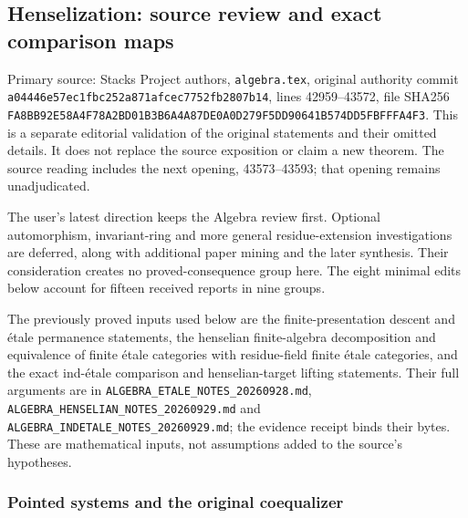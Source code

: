 \subsection{Henselization: source review and exact comparison maps}\label{algebra-proof-060-henselization-source-review-and-exact-comparison-maps}

Primary source: Stacks Project authors, \texttt{algebra.tex}, original authority commit \texttt{a044\allowbreak{}46e5\allowbreak{}7ec1\allowbreak{}fbc2\allowbreak{}52a8\allowbreak{}71af\allowbreak{}cec7\allowbreak{}752f\allowbreak{}b280\allowbreak{}7b14}, lines 42959--43572, file SHA256 \texttt{FA8B\allowbreak{}B92E\allowbreak{}58A4\allowbreak{}F78A\allowbreak{}2BD0\allowbreak{}1B3B\allowbreak{}6A4A\allowbreak{}87DE\allowbreak{}0A0D\allowbreak{}279F\allowbreak{}5DD9\allowbreak{}0641\allowbreak{}B574\allowbreak{}DD5F\allowbreak{}BFFF\allowbreak{}A4F3}. This is a separate editorial validation of the original statements and their omitted details. It does not replace the source exposition or claim a new theorem. The source reading includes the next opening, 43573--43593; that opening remains unadjudicated.

The user's latest direction keeps the Algebra review first. Optional automorphism, invariant-ring and more general residue-extension investigations are deferred, along with additional paper mining and the later synthesis. Their consideration creates no proved-consequence group here. The eight minimal edits below account for fifteen received reports in nine groups.

The previously proved inputs used below are the finite-presentation descent and étale permanence statements, the henselian finite-algebra decomposition and equivalence of finite étale categories with residue-field finite étale categories, and the exact ind-étale comparison and henselian-target lifting statements. Their full arguments are in \texttt{ALGEBRA\_\allowbreak{}ETALE\_\allowbreak{}NOTES\_\allowbreak{}20260928.\allowbreak{}md}, \texttt{ALGEBRA\_\allowbreak{}HENSELIAN\_\allowbreak{}NOTES\_\allowbreak{}20260929.\allowbreak{}md} and \texttt{ALGEBRA\_\allowbreak{}INDETALE\_\allowbreak{}NOTES\_\allowbreak{}20260929.\allowbreak{}md}; the evidence receipt binds their bytes. These are mathematical inputs, not assumptions added to the source's hypotheses.

\subsubsection{Pointed systems and the original coequalizer}\label{algebra-proof-060-pointed-systems-and-the-original-coequalizer}

